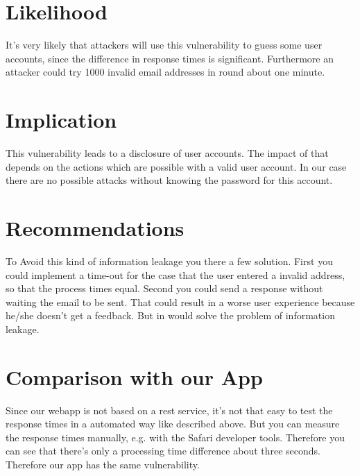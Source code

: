 \section{Likelihood}
It's very likely that attackers will use this vulnerability to guess some user accounts, since the difference in response times is significant. Furthermore an attacker could try 1000 invalid email addresses in round about one minute. 

\section{Implication} 
This vulnerability leads to a disclosure of user accounts. The impact of that depends on the actions which are possible with a valid user account. In our case there are no possible attacks without knowing the password for this account.


\section{Recommendations}
To Avoid this kind of information leakage you there a few solution. First you could implement a time-out for the case that the user entered a invalid address, so that the process times equal. Second you could send a response without waiting the email to be sent.
That could result in a worse user experience because he/she doesn't get a feedback. But in would solve the problem of information leakage.

\section{Comparison with our App}
Since our webapp is not based on a rest service, it's not that easy to test the response times in a automated way like described above. But you can measure the response times manually, e.g. with the Safari developer tools. Therefore you can see that there's only a processing time difference about three seconds. Therefore our app has the same vulnerability.

